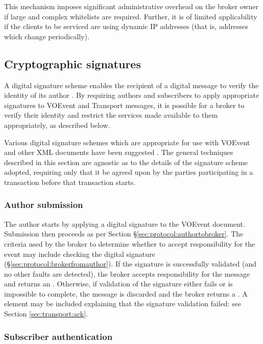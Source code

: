 \documentclass[a4paper,11pt]{ivoa}
\begin{document}
This mechanism imposes significant administrative overhead on the broker owner
if large and complex whitelists are required. Further, it is of limited
applicability if the clients to be serviced are using dynamic IP addresses
(that is, addresses which change periodically).

\subsection{Cryptographic signatures}
\label{sec:limit:crypto}

A digital signature scheme enables the recipient of a digital message to
verify the identity of its author \citep{Diffie:1976}. By requiring authors
and subscribers to apply appropriate signatures to VOEvent and Transport
messages, it is possible for a broker to verify their identity and restrict
the services made available to them appropriately, as described below.

Various digital signature schemes which are appropriate for use with VOEvent
and other XML documents have been suggested \citep{Allen:2008, Denny:2008}.
The general techniques described in this section are agnostic as to the
details of the signature scheme adopted, requiring only that it be agreed upon
by the parties participating in a transaction before that transaction starts.

\subsubsection{Author submission}
\label{sec:limit:crypto:author}

The author starts by applying a digital signature to the VOEvent document.
Submission then proceeds as per Section \S\ref{sec:protocol:authortobroker}.
The criteria used by the broker to determine whether to accept responsibility
for the event may include checking the digital signature
(\S\ref{sec:protocol:brokerfromauthor}). If the signature is successfully
validated (and no other faults are detected), the broker accepts
responsibility for the message and returns an .  Otherwise, if
validation of the signature either fails or is impossible to complete, the
message is discarded and the broker returns a . A
 element may be included explaining that the signature
validation failed: see Section \ref{sec:transport:ack}.

\subsubsection{Subscriber authentication}
\label{sec:limit:crypto:subscriber}
\end{document}
